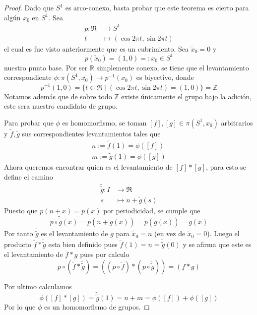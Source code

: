 \begin{proof}
  Dado que \(S^1\) es arco-conexo, basta probar que este teorema es
  cierto para algún \(x_0\) en \(S^1\). Sea
  \begin{align*}
    p : \Re &\longrightarrow S^1 \\
    t &\longmapsto \left( \cos 2 \pi t, \sin 2 \pi t \right)
  \end{align*}
  el cual es fue visto anteriormente
  que es un cubrimiento. Sea \(\tilde x _0 = 0\) y
  \[ p(\tilde x _0) = (1,0) =: x_0 \in S^1\]
  nuestro punto base. Por ser \(\mathbb R\) simplemente conexo, se
  tiene que el levantamiento correspondiente \(\phi : \pi (S^1, x_0) \to
  p^{-1} (x_0)\) es biyectivo, donde
  \[ p^{-1} (1,0) = \{t \in \Re \mid (\cos 2 \pi t, \sin 2 \pi t)
    = (1, 0) \} = \mathbb Z \]
  Notamos además que de sobre todo \(\mathbb Z\) existe únicamente el
  grupo bajo la adición, este sera nuestro candidato de grupo.

  Para probar que \(\phi\) es homomorfismo, se toman \([f], [g] \in \pi
  (S^1, x_0)\) arbitrarios y \(\tilde f, \tilde g\) sus correspondientes
  levantamientos tales que
  \begin{gather*}
    n := \tilde f (1) = \phi ([f]) \\
    m := \tilde g (1) = \phi ([g])
  \end{gather*}
  Ahora queremos encontrar quien es el levantamiento de \([f] * [g]\),
  para esto se define el camino
  \begin{align*}
    \tilde{\tilde g} : I &\longrightarrow \Re \\
    s &\longmapsto n + \tilde g (s)
  \end{align*}
  Puesto que \(p(n + x) = p(x)\) por periodicidad, se cumple que
  \[ p \circ \tilde{\tilde g} (x) = p (n + \tilde g (x)) = p (\tilde g
    (x)) = g (x) \]
  Por tanto \(\tilde{\tilde g}\) es el levantamiento de \(g\) para
  \(\tilde x_0 = n\) (en vez de \(\tilde x_0 = 0\)). Luego el producto
  \(\tilde f * \tilde{\tilde g}\) esta bien definido pues \(\tilde f (1)
  = n = \tilde{\tilde g} (0)\) y se afirma que este es el levantamiento
  de \(f * g\) pues por calculo
  \[ p \circ (\tilde f * \tilde{\tilde g}) =
     ((p \circ \tilde f) * (p \circ \tilde{\tilde g})) =
     (f * g)
  \]

  Por ultimo calculamos
  \[ \phi ([f] * [g]) = \tilde{\tilde g} (1) = n + m = \phi ([f]) + \phi
  ([g]) \]
  Por lo que \(\phi\) es un homomorfismo de grupos.
\end{proof}

